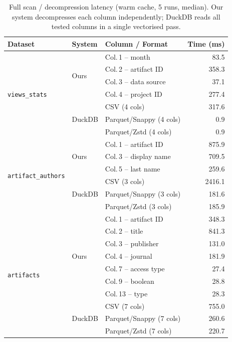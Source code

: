 \documentclass[a4paper,11pt]{article}
\begin{document}
\begin{table}[h]
\centering
\caption{Full scan / decompression latency (warm cache, 5 runs, median).
         Our system decompresses each column independently; DuckDB reads
         all tested columns in a single vectorised pass.}
\label{tab:fullscan}
\begin{tabular}{lllr}
\toprule
\textbf{Dataset} & \textbf{System} & \textbf{Column / Format} &
  \textbf{Time (ms)} \\
\midrule
\multirow{7}{*}{\texttt{views\_stats}}
  & \multirow{4}{*}{Ours}
    & Col.\,1 -- month        &   83.5 \\
  & & Col.\,2 -- artifact ID  &  358.3 \\
  & & Col.\,3 -- data source  &   37.1 \\
  & & Col.\,4 -- project ID   &  277.4 \\
\cmidrule{2-4}
  & \multirow{3}{*}{DuckDB}
    & CSV (4 cols)             &  317.6 \\
  & & Parquet/Snappy (4 cols)  &    0.9 \\
  & & Parquet/Zstd  (4 cols)  &    0.9 \\
\midrule
\multirow{6}{*}{\texttt{artifact\_authors}}
  & \multirow{3}{*}{Ours}
    & Col.\,1 -- artifact ID   &  875.9 \\
  & & Col.\,3 -- display name  &  709.5 \\
  & & Col.\,5 -- last name     &  259.6 \\
\cmidrule{2-4}
  & \multirow{3}{*}{DuckDB}
    & CSV (3 cols)             & 2416.1 \\
  & & Parquet/Snappy (3 cols)  &  181.6 \\
  & & Parquet/Zstd  (3 cols)  &  185.9 \\
\midrule
\multirow{10}{*}{\texttt{artifacts}}
  & \multirow{7}{*}{Ours}
    & Col.\,1  -- artifact ID  &  348.3 \\
  & & Col.\,2  -- title        &  841.3 \\
  & & Col.\,3  -- publisher    &  131.0 \\
  & & Col.\,4  -- journal      &  181.9 \\
  & & Col.\,7  -- access type  &   27.4 \\
  & & Col.\,9  -- boolean      &   28.8 \\
  & & Col.\,13 -- type         &   28.3 \\
\cmidrule{2-4}
  & \multirow{3}{*}{DuckDB}
    & CSV (7 cols)             &  755.0 \\
  & & Parquet/Snappy (7 cols)  &  260.6 \\
  & & Parquet/Zstd  (7 cols)  &  220.7 \\
\bottomrule
\end{tabular}
\end{table}
\end{document}
